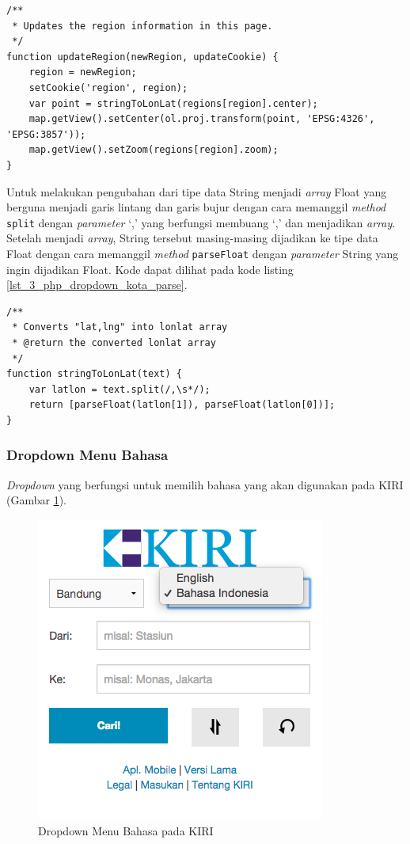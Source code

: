 \begin{lstlisting}[caption=Fungsi JavaScript untuk memperbarui peta ,label = {lst_3_php_dropdown_kota_update}]
/**
 * Updates the region information in this page.
 */
function updateRegion(newRegion, updateCookie) {
	region = newRegion;
	setCookie('region', region);
	var point = stringToLonLat(regions[region].center);
	map.getView().setCenter(ol.proj.transform(point, 'EPSG:4326', 'EPSG:3857'));
	map.getView().setZoom(regions[region].zoom);
}
\end{lstlisting}

Untuk melakukan pengubahan dari tipe data String menjadi \textit{array} Float yang berguna menjadi garis lintang dan garis bujur dengan cara memanggil \textit{method} \verb!split! dengan \textit{parameter} `,' yang berfungsi membuang `,' dan menjadikan \textit{array}. Setelah menjadi \textit{array}, String tersebut masing-masing dijadikan ke tipe data Float dengan cara memanggil \textit{method} \verb!parseFloat! dengan \textit{parameter} String yang ingin dijadikan Float. Kode dapat dilihat pada kode listing \ref{lst_3_php_dropdown_kota_parse}.

\begin{lstlisting}[caption=Fungsi JavaScript untuk mengubah String menjadi \textit{array} Float ,label = {lst_3_php_dropdown_kota_parse}]
/**
 * Converts "lat,lng" into lonlat array
 * @return the converted lonlat array
 */
function stringToLonLat(text) {
	var latlon = text.split(/,\s*/);
	return [parseFloat(latlon[1]), parseFloat(latlon[0])];
}
\end{lstlisting}

\subsubsection{Dropdown Menu Bahasa}
\textit{Dropdown} yang berfungsi untuk memilih bahasa yang akan digunakan pada KIRI (Gambar \ref{fig:3_KIRI_drop_bahasa}).

\begin{figure}[H]
	\centering
	\includegraphics[scale=0.5]{Gambar/KIRI-drop-bahasa}
	\caption{Dropdown Menu Bahasa pada KIRI} 
	\label{fig:3_KIRI_drop_bahasa}
\end{figure}

